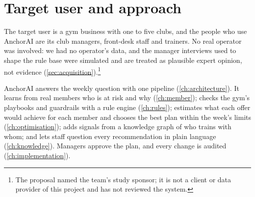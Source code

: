 

\section{Target user and approach}

The target user is a gym business with one to five clubs, and the people who use AnchorAI are its club managers, front-desk staff and trainers. No real operator was involved: we had no operator's data, and the manager interviews used to shape the rule base were simulated and are treated as plausible expert opinion, not evidence (\cref{sec:acquisition}).\footnote{The proposal named the team's study sponsor; it is not a client or data provider of this project and has not reviewed the system.}

AnchorAI answers the weekly question with one pipeline (\cref{ch:architecture}). It learns from real members who is at risk and why (\cref{ch:member}); checks the gym's playbooks and guardrails with a rule engine (\cref{ch:rules}); estimates what each offer would achieve for each member and chooses the best plan within the week's limits (\cref{ch:optimisation}); adds signals from a knowledge graph of who trains with whom; and lets staff question every recommendation in plain language (\cref{ch:knowledge}). Managers approve the plan, and every change is audited (\cref{ch:implementation}).
